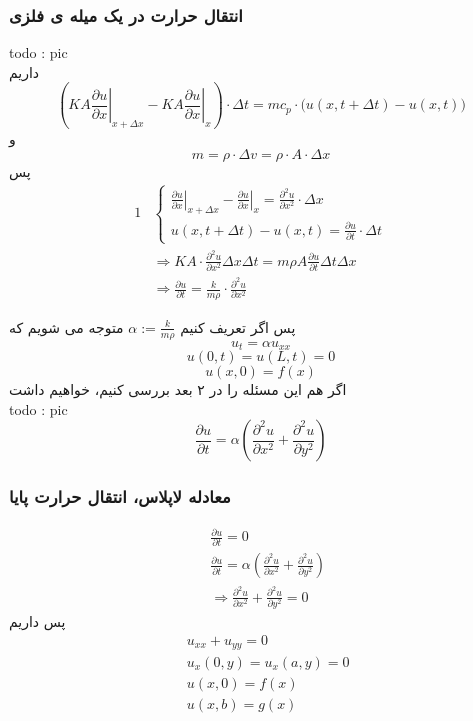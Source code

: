 \subsubsection{انتقال حرارت در یک میله ی فلزی}
todo : pic\\
داریم
\[(\left.KA\frac{\partial u}{\partial x}\right|_{x+\Delta x}-\left.KA\frac{\partial u}{\partial x}\right|_{x}) \cdot \Delta t=
	mc_p \cdot \Big(u(x,t+\Delta t)-u(x,t)\Big)\]
و
\[m=\rho \cdot \Delta v=\rho \cdot  A \cdot \Delta x\]
پس
\begin{alignat*}{1}
&\begin{cases}
\left.\frac{\partial u}{\partial x}\right|_{x+\Delta x}-\left.\frac{\partial u}{\partial x}\right|_{x} = \frac{\partial^2 u}{\partial x^2}  \cdot \Delta x\\
u(x,t+\Delta t)-u(x,t)=\frac{\partial u}{\partial t} \cdot \Delta t
\end{cases} 
\\& \Rightarrow 
K A \cdot \frac{\partial^2 u}{\partial x^2}  \Delta x \Delta t=m\rho A\frac{\partial u}{\partial t}\Delta t\Delta x
\\& \Rightarrow
\frac{\partial u}{\partial t}=\frac{k}{m\rho} \cdot \frac{\partial^2 u}{\partial x^2}
\end{alignat*}

پس اگر تعریف کنیم
$\alpha := \frac{k}{m\rho}$
متوجه می شویم که\\
\[u_t=\alpha u_{xx}\]
\[u(0,t)=u(L,t)=0\]
\[u(x,0)=f(x)\]
اگر هم این مسئله را در ۲ بعد بررسی کنیم، خواهیم داشت\\
todo : pic
\[\frac{\partial u}{\partial t}=\alpha(\frac{\partial^2 u}{\partial x^2}+\frac{\partial^2 u}{\partial y^2})\]
\subsubsection{
	معادله لاپلاس، انتقال حرارت پایا
}
\begin{equation*}
	\begin{aligned}
	{} &\ \frac{\partial u}{\partial t}=0 \\
	&\ \frac{\partial u}{\partial t}=\alpha(\frac{\partial^2 u}{\partial x^2}+\frac{\partial^2 u}{\partial y^2}) \\
	&\ \Rightarrow \frac{\partial^2 u}{\partial x^2}+\frac{\partial^2 u}{\partial y^2}=0
	\end{aligned}
\end{equation*}
پس داریم
\begin{equation*}
\begin{aligned}
{} &\ 
u_{xx}+u_{yy}=0
\\
&\
u_x(0,y)=u_x(a,y)=0
\\
&\
u(x,0)=f(x)
\\
&\
u(x,b)=g(x)
\\
\end{aligned}
\end{equation*}



